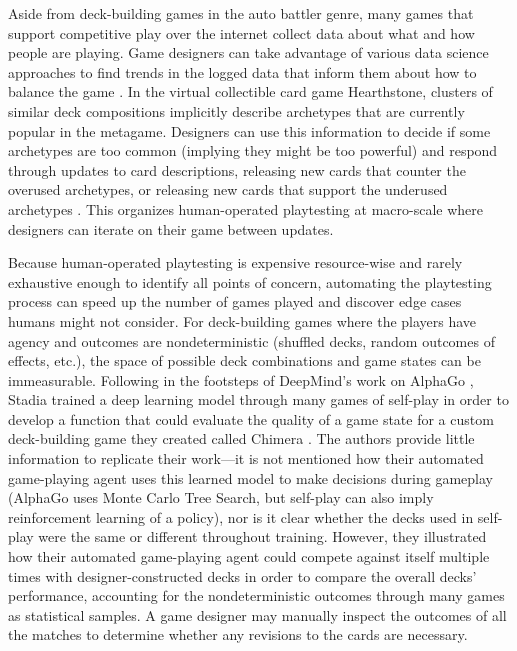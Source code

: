 Aside from deck-building games in the auto battler genre, many games that support competitive
play over the internet collect data about what and how people are playing.  Game
designers can take advantage of various data science approaches to find trends in
the logged data that inform them about how to balance the game \cite{nce-gameAIpro2}.
In the virtual collectible card game Hearthstone, clusters of similar deck
compositions implicitly describe archetypes that are currently popular in the
metagame.  Designers can use this information to decide if some archetypes are too
common (implying they might be too powerful) and respond through updates to card
descriptions, releasing new cards that counter the overused archetypes, or
releasing new cards that support the underused archetypes \cite{blizzard-gamebalancetalk-keg2019}.
This %
organizes human-operated playtesting at macro-scale where designers
can iterate on their game between updates. %

Because human-operated playtesting is expensive resource-wise and rarely
exhaustive enough to identify all points of concern, automating the playtesting
process can speed up the number of games played and discover edge cases humans
might not consider.  For deck-building games where the players have
agency and outcomes are nondeterministic (shuffled decks, random outcomes of effects,
etc.), the space of possible deck combinations and game states can be immeasurable.
Following in the footsteps of DeepMind's work on AlphaGo \cite{alphago}, Stadia
trained a deep learning model through many games of self-play in order to develop
a function that could evaluate the quality of a game state for a custom deck-building
game they created called Chimera \cite{chimera-mlagent}.  The authors provide
little information to replicate their work---it is not mentioned how their automated
game-playing agent uses this learned model to make decisions during gameplay
(AlphaGo uses Monte Carlo Tree Search, but self-play can also imply reinforcement
learning of a policy), nor is it clear whether the decks used in self-play were
the same or different throughout training.  However, they illustrated how their
automated game-playing agent could compete against itself multiple times with
designer-constructed decks in order to compare the overall decks' performance,
accounting for the nondeterministic outcomes through many games as statistical
samples.  A game designer may manually inspect the outcomes of all the matches
to determine whether any revisions to the cards are necessary.

